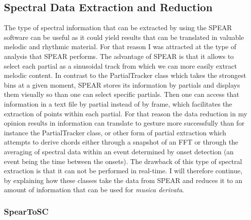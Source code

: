 \subsection{Spectral Data Extraction and Reduction}

The type of spectral information that can be extracted by using the SPEAR software can be useful as it could yield results that can be translated in valuable melodic and rhythmic material. For that reason I was attracted at the type of analysis that SPEAR performs. The advantage of SPEAR is that it allows to select each partial as a sinusoidal track from which we can more easily extract melodic content. In contrast to the PartialTracker class which takes the strongest bins at a given moment, SPEAR stores its information by partials and displays them visually so than one can select specific partials. Then one can access that information in a text file by partial instead of by frame, which facilitates the extraction of points within each partial. For that reason the data reduction in my opinion results in information can translate to gesture more successfully than for instance the PartialTracker class, or other form of partial extraction which attempts to derive chords either through a snapshot of an FFT or through the averaging of spectral data within an event determined by onset detection (an event being the time between the onsets). The drawback of this type of spectral extraction is that it can not be performed in real-time. I will therefore continue, by explaining how these classes take the data from SPEAR and reduces it to an amount of information that can be used for \emph{musica derivata}.

\hypertarget{spearsc}{}
\subsubsection{SpearToSC}

